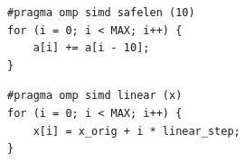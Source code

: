 \noindent\begin{minipage}{\linewidth}
\begin{lstlisting}[language=c_language, caption={Safelen, maximální počet iterací, které se mohou vykonávat současně bez porušení závislostí.}]
#pragma omp simd safelen (10)
for (i = 0; i < MAX; i++) {
    a[i] += a[i - 10];
}
\end{lstlisting}
\end{minipage}

\noindent\begin{minipage}{\linewidth}
\begin{lstlisting}[language=c_language, caption={Linear, hodnota proměnné je ve vztahu k číslu iterace.}]
#pragma omp simd linear (x)
for (i = 0; i < MAX; i++) {
    x[i] = x_orig + i * linear_step;
}
\end{lstlisting}
\end{minipage}
